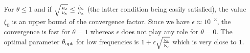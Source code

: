 For $\theta \leq 1$ and if 
$\sqrt{\frac{\nu_{\rm o}}{\nu_{\rm a}}} \leq \frac{h_{\rm o}}{h_{\rm a}}$
(the latter condition being easily satisfied), 
the value $\xi_0$ is an upper bound 
of the convergence factor.
Since we have $\epsilon \approx 10^{-3}$, 
the convergence is fast for $\theta = 1$ whereas $\epsilon$
does not play any role for $\theta = 0$.
%
The optimal parameter $\theta_{\rm opt}$ for low frequencies is $1 +  \epsilon\sqrt{\frac{\nu_{\rm a}}{\nu_{\rm o}}}$ which is very close to $1$.
